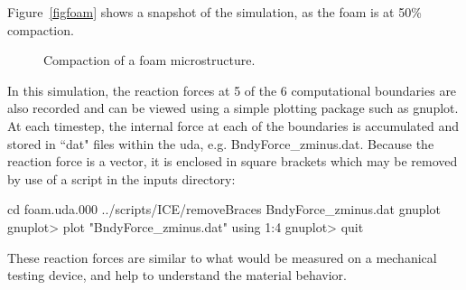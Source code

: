 \documentclass[fleqn]{article}
\begin{document}
Figure~\ref{figfoam} shows a snapshot of the simulation, as the foam
is at 50\% compaction.
\begin{figure}[b]
  \center
  \caption{Compaction of a foam microstructure.}
  \label{figdisks}
\end{figure}

In this simulation, the reaction forces at 5 of the 6 computational boundaries
are also recorded and can be viewed using a simple plotting package such
as gnuplot.  At each timestep, the internal force at each of the boundaries
is accumulated and stored in ``dat" files within the uda,
e.g. BndyForce\_zminus.dat.  Because the reaction force is a vector, it
is enclosed in square brackets which may be removed by use of a script in
the inputs directory:

cd foam.uda.000
../scripts/ICE/removeBraces BndyForce\_zminus.dat
gnuplot
gnuplot> plot "BndyForce\_zminus.dat" using 1:4
gnuplot> quit

These reaction forces are similar to what would be measured on a mechanical
testing device, and help to understand the material behavior.


\end{document}
